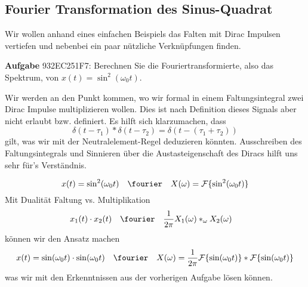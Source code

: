 \newpage
\subsection{Fourier Transformation des Sinus-Quadrat}
\label{sec:932EC251F7}
\begin{Ziel}
Wir wollen anhand eines einfachen Beispiels das Falten mit Dirac Impulsen
vertiefen und nebenbei ein paar nützliche Verknüpfungen finden.
\end{Ziel}
\textbf{Aufgabe} {\tiny 932EC251F7}: Berechnen Sie die Fouriertransformierte, also
das Spektrum, von $x(t)=\sin^2(\omega_0 t)$.
\begin{Werkzeug}
Wir werden an den Punkt kommen, wo wir formal in einem Faltungsintegral
zwei Dirac Impulse multiplizieren wollen. Dies ist nach Definition dieses Signals
aber nicht erlaubt bzw. definiert.
Es hilft sich klarzumachen, dass
\begin{equation}
\label{eq:ue4_dirac_conv_dirac}
  \delta(t-\tau_1) \ast \delta(t-\tau_2) = \delta(t-(\tau_1+\tau_2))
\end{equation}
gilt, was wir mit der Neutralelement-Regel deduzieren könnten. Ausschreiben des
Faltungsintegrals und Sinnieren über die Austasteigenschaft des Diracs
hilft uns sehr für's Verständnis.
\end{Werkzeug}
\begin{Ansatz}
\begin{equation}
  x(t)  = \sin^2(\omega_0 t) \quad\fourier\quad X(\omega) = \mathcal{F}\{\sin^2(\omega_0 t)\}
\end{equation}
Mit Dualität Faltung vs. Multiplikation
\begin{align}
x_1(t) \cdot x_2(t) &\quad \fourier \quad \frac{1}{2\pi} X_1(\omega) \ast_\omega X_2(\omega)
\end{align}
können wir den Ansatz machen
\begin{equation}
  x(t)  = \sin(\omega_0 t)\cdot \sin(\omega_0 t) \quad\fourier\quad X(\omega) = \frac{1}{2\pi} \mathcal{F}\{\sin(\omega_0 t)\} \ast \mathcal{F}\{\sin(\omega_0 t)\}
\end{equation}
was wir mit den Erkenntnissen aus der vorherigen Aufgabe lösen können.
\end{Ansatz}
